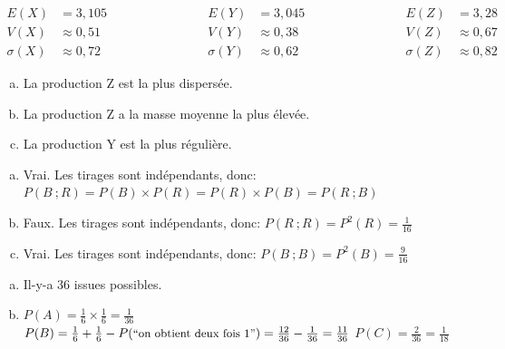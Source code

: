 \documentclass[12pt, a4paper]{article}
\begin{document}
    \begin{Exercise}[number={62}]
      \begin{equation*}
        \begin{aligned}
          E(X)&= 3{,}105 \\ V(X)&\approx 0{,}51 \\ \sigma(X)&\approx 0{,}72
        \end{aligned}
        \hspace{3cm}
        \begin{aligned}
          E(Y)&=3{,}045 \\ V(Y)&\approx 0{,}38 \\ \sigma(Y)&\approx 0{,}62
        \end{aligned}
        \hspace{3cm}
        \begin{aligned}
          E(Z)&=3{,}28 \\ V(Z)&\approx 0{,}67 \\ \sigma(Z)&\approx 0{,}82
        \end{aligned}
      \end{equation*} \bigbreak
      \begin{enumerate}[a)]
        \item La production Z est la plus dispersée.
        \item La production Z a la masse moyenne la plus élevée.
        \item La production Y est la plus régulière.
      \end{enumerate}
    \end{Exercise}

    \begin{Exercise}[number={64}]
      \begin{enumerate}[a)]
        \item Vrai. Les tirages sont indépendants, donc: $P(B\ ;R)=P(B)\times P(R)=P(R)\times P(B)=P(R\ ;B)$
        \item Faux. Les tirages sont indépendants, donc: $P(R\ ;R)=P^2(R)=\frac{1}{16}$
        \item Vrai. Les tirages sont indépendants, donc: $P(B\ ;B)=P^2(B)=\frac{9}{16}$
      \end{enumerate}
    \end{Exercise}

    \begin{Exercise}[number={65}]
      \begin{enumerate}[a)]
        \item Il-y-a 36 issues possibles.
        \item $P(A)=\frac{1}{6}\times\frac{1}{6}=\frac{1}{36}$ \smallbreak
              $P(B)=\frac{1}{6}+\frac{1}{6}-P(\text{\small{``on obtient deux fois 1''}})=\frac{12}{36}-\frac{1}{36}=\frac{11}{36}$ \smallbreak
              $P(C)=\frac{2}{36}=\frac{1}{18}$ 
      \end{enumerate}
    \end{Exercise}
\end{document}
